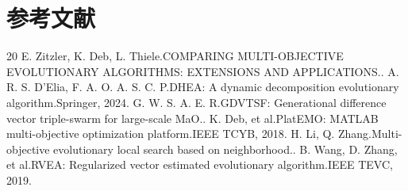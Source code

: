 \documentclass[a4paper,11pt]{article}
\begin{document}
\section*{参考文献}
\begin{thebibliography}{20}
 E. Zitzler, K. Deb, L. Thiele.\newblock COMPARING MULTI-OBJECTIVE EVOLUTIONARY ALGORITHMS: EXTENSIONS AND APPLICATIONS..
 A. R. S. D'Elia, F. A. O. A. S. C. P.\newblock DHEA: A dynamic decomposition evolutionary algorithm.\newblock Springer, 2024.
 G. W. S. A. E. R.\newblock GDVTSF: Generational difference vector triple-swarm for large-scale MaO..
 K. Deb, et al.\newblock PlatEMO: MATLAB multi-objective optimization platform.\newblock IEEE TCYB, 2018.
 H. Li, Q. Zhang.\newblock Multi-objective evolutionary local search based on neighborhood..
 B. Wang, D. Zhang, et al.\newblock RVEA: Regularized vector estimated evolutionary algorithm.\newblock IEEE TEVC, 2019.
\end{thebibliography}
\end{document}
